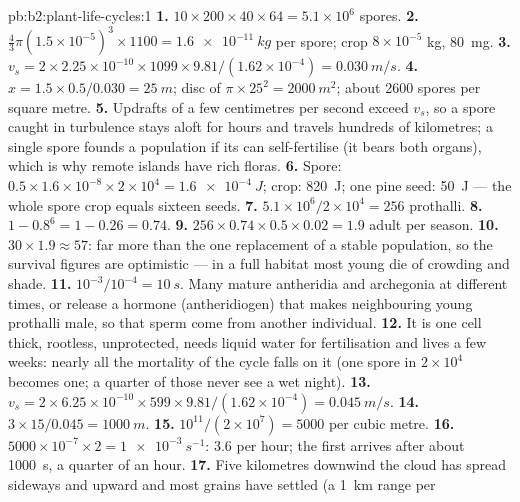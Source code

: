 \begin{solution}{pb:b2:plant-life-cycles:1}
\textbf{1.} $10\times 200\times 40\times 64 = 5.1\times 10^{6}$
spores.
\textbf{2.} $\tfrac43\pi(1.5\times 10^{-5})^3\times 1100 =
\qty{1.6e-11}{kg}$ per spore; crop $8\times 10^{-5}$ kg, \qty{80}{mg}.
\textbf{3.} $v_s = 2\times 2.25\times 10^{-10}\times 1099\times
9.81/(1.62\times 10^{-4}) = \qty{0.030}{m/s}$.
\textbf{4.} $x = 1.5\times 0.5/0.030 = \qty{25}{m}$; disc of
$\pi\times 25^2 = \qty{2000}{m^2}$; about \num{2600} spores per
square metre.
\textbf{5.} Updrafts of a few centimetres per second exceed $v_s$, so
a spore caught in turbulence stays aloft for hours and travels
hundreds of kilometres; a single spore founds a population if its
 can self-fertilise (it bears both organs), which is why
remote islands have rich  floras.
\textbf{6.} Spore: $0.5\times 1.6\times 10^{-8}\times 2\times 10^{4} =
\qty{1.6e-4}{J}$; crop: \qty{820}{J}; one pine seed: \qty{50}{J} ---
the whole spore crop equals sixteen seeds.
\textbf{7.} $5.1\times 10^{6}/2\times 10^{4} = 256$ prothalli.
\textbf{8.} $1 - 0.8^{6} = 1 - 0.26 = 0.74$.
\textbf{9.} $256\times 0.74\times 0.5\times 0.02 = 1.9$ adult 
per season.
\textbf{10.} $30\times 1.9 \approx 57$: far more than the one
replacement of a stable population, so the survival figures are
optimistic --- in a full habitat most young  die of
crowding and shade.
\textbf{11.} $10^{-3}/10^{-4} = \qty{10}{s}$. Many  mature
antheridia and archegonia at different times, or release a hormone
(antheridiogen) that makes neighbouring young prothalli male, so
that sperm come from another individual.
\textbf{12.} It is one cell thick, rootless, unprotected, needs
liquid water for fertilisation and lives a few weeks: nearly all the
mortality of the cycle falls on it (one spore in $2\times 10^{4}$
becomes one; a quarter of those never see a wet night).
\textbf{13.} $v_s = 2\times 6.25\times 10^{-10}\times 599\times
9.81/(1.62\times 10^{-4}) = \qty{0.045}{m/s}$.
\textbf{14.} $3\times 15/0.045 = \qty{1000}{m}$.
\textbf{15.} $10^{11}/(2\times 10^{7}) = \num{5000}$ per cubic metre.
\textbf{16.} $5000\times 10^{-7}\times 2 = \qty{1e-3}{s^{-1}}$: 3.6 per
hour; the first arrives after about \qty{1000}{s}, a quarter of an
hour.
\textbf{17.} Five kilometres downwind the cloud has spread sideways
and upward and most grains have settled (a \qty{1}{km} range per

\end{solution}
